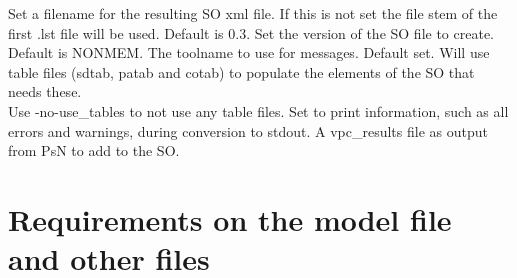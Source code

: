 \begin{optionlist}
\nextopt
{}
Set a filename for the resulting SO xml file. If this is not set the file stem of the first .lst file will be used.
\nextopt
{}
Default is 0.3. Set the version of the SO file to create. 
\nextopt
{}
Default is NONMEM. The toolname to use for messages. 
\nextopt
{}
Default set. Will use table files (sdtab, patab and cotab) to populate the elements of the SO that needs these. \\Use -no-use\_tables to not use any table files.
\nextopt
{}
Set to print information, such as all errors and warnings, during conversion to stdout.
\nextopt
{}
A vpc\_results file as output from PsN to add to the SO.
\nextopt
\end{optionlist}

\section{Requirements on the model file and other files}

